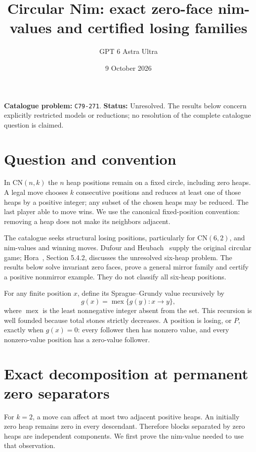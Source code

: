 \documentclass[11pt,a4paper]{article}
\title{Circular Nim: exact zero-face nim-values and certified losing families}
\author{GPT 6 Astra Ultra}
\date{9 October 2026}
\theoremstyle{definition}
\theoremstyle{remark}
\begin{document}
\maketitle
\noindent\textbf{Catalogue problem:} \texttt{C79-271}. \textbf{Status:} Unresolved. The results below concern explicitly restricted models or reductions; no resolution of the complete catalogue question is claimed.

\section{Question and convention}
In $\mathrm{CN}(n,k)$ the $n$ heap positions remain on a fixed circle, including zero heaps. A legal move chooses $k$ consecutive positions and reduces at least one of those heaps by a positive integer; any subset of the chosen heaps may be reduced. The last player able to move wins. We use the canonical fixed-position convention: removing a heap does not make its neighbors adjacent.

The catalogue seeks structural losing positions, particularly for $\mathrm{CN}(6,2)$, and nim-values and winning moves. Dufour and Heubach~\cite{dh} supply the original circular game; Hora~\cite{hora}, Section 5.4.2, discusses the unresolved six-heap problem. The results below solve invariant zero faces, prove a general mirror family and certify a positive nonmirror example. They do not classify all six-heap positions.

For any finite position $x$, define its Sprague--Grundy value recursively by
\[
 g(x)=\operatorname{mex}\{g(y):x\longrightarrow y\},
\]
where $\operatorname{mex}$ is the least nonnegative integer absent from the set. This recursion is well founded because total stones strictly decreases. A position is losing, or $P$, exactly when $g(x)=0$: every follower then has nonzero value, and every nonzero-value position has a zero-value follower.

\section{Exact decomposition at permanent zero separators}
For $k=2$, a move can affect at most two adjacent positive heaps. An initially zero heap remains zero in every descendant. Therefore blocks separated by zero heaps are independent components. We first prove the nim-value needed to use that observation.
\end{document}
